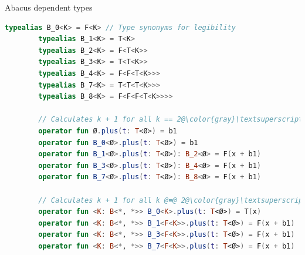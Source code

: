 \documentclass{beamer}
\begin{document}
    \begin{frame}[fragile]{Abacus dependent types}
        \begin{lstlisting}[language=Kotlin, gobble=7]
        typealias B_0<K> = F<K> // Type synonyms for legibility
        typealias B_1<K> = T<K>
        typealias B_2<K> = F<T<K>>
        typealias B_3<K> = T<T<K>>
        typealias B_4<K> = F<F<T<K>>>
        typealias B_7<K> = T<T<T<K>>>
        typealias B_8<K> = F<F<F<T<K>>>>

        // Calculates k + 1 for all k == 2@\color{gray}\textsuperscript{n}@ - 1, 0 <= n < 4
        operator fun Ø.plus(t: T<Ø>) = b1
        operator fun B_0<Ø>.plus(t: T<Ø>) = b1
        operator fun B_1<Ø>.plus(t: T<Ø>): B_2<Ø> = F(x + b1)
        operator fun B_3<Ø>.plus(t: T<Ø>): B_4<Ø> = F(x + b1)
        operator fun B_7<Ø>.plus(t: T<Ø>): B_8<Ø> = F(x + b1)

        // Calculates k + 1 for all k @≡@ 2@\color{gray}\textsuperscript{n}@ - 1 (mod 2@\color{gray}\textsuperscript{n+1}@), 1 <= n < 4
        operator fun <K: B<*, *>> B_0<K>.plus(t: T<Ø>) = T(x)
        operator fun <K: B<*, *>> B_1<F<K>>.plus(t: T<Ø>) = F(x + b1)
        operator fun <K: B<*, *>> B_3<F<K>>.plus(t: T<Ø>) = F(x + b1)
        operator fun <K: B<*, *>> B_7<F<K>>.plus(t: T<Ø>) = F(x + b1)
        \end{lstlisting}
    \end{frame}
\end{document}
